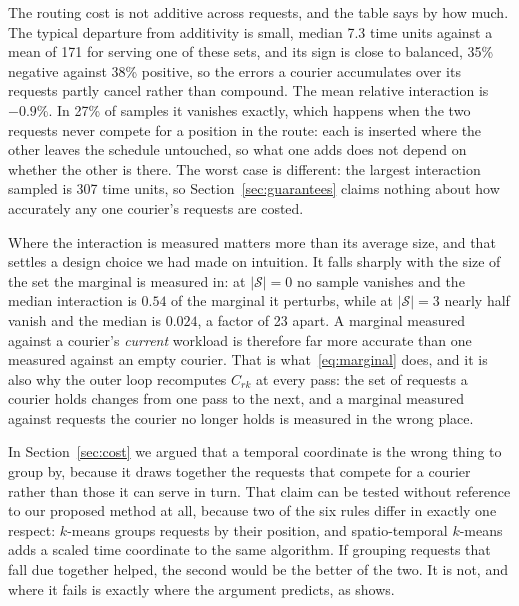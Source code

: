 The routing cost is not additive across requests, and the table says by how
much. The typical departure from additivity is small, median
7.3 time units against a mean of 171 for
serving one of these sets, and its sign is close to balanced,
35\% negative against 38\% positive, so the errors a courier
accumulates over its requests partly cancel rather than compound. The mean
relative interaction is $-0.9\%$. In
27\% of samples it vanishes exactly, which happens when the two requests
never compete for a position in the route: each is inserted where the other
leaves the schedule untouched, so what one adds does not depend on whether the
other is there. The worst case is different: the largest interaction sampled is
307 time units, so Section~\ref{sec:guarantees} claims nothing about how
accurately any one courier's requests are costed.

Where the interaction is measured matters more than its average size, and that
settles a design choice we had made on intuition. It falls sharply with the size
of the set the marginal is measured in: at $|\mathcal{S}|=0$ no sample vanishes
and the median interaction is $0.54$ of the marginal it
perturbs, while at $|\mathcal{S}|=3$ nearly half
vanish and the median is $0.024$, a factor of
23 apart. A
marginal measured against a courier's \emph{current} workload is therefore far
more accurate than one measured against an empty courier. That is
what~\eqref{eq:marginal} does, and it is also why the outer loop recomputes
$C_{rk}$ at every pass: the set of requests a courier holds changes from one
pass to the next, and a marginal measured against requests the courier no longer
holds is measured in the wrong place.

\label{sec:temporal}\label{sec:slack}
In Section~\ref{sec:cost} we argued that a temporal coordinate is the wrong
thing to group by, because it draws together the requests that compete for a
courier rather than those it can serve in turn. That claim can be tested without
reference to our proposed method at all, because two of the six rules differ
in exactly
one respect: $k$-means groups requests by their position, and spatio-temporal
$k$-means adds a scaled time coordinate to the same algorithm. If grouping requests that fall due together
helped, the second would be the better of the two. It is not, and where it
fails is exactly where the argument predicts, as
 shows.

